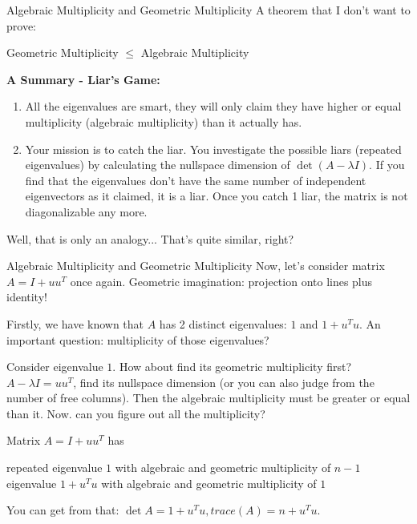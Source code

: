 \documentclass{beamer}
\begin{document}
\begin{frame}{Algebraic Multiplicity and Geometric Multiplicity}
A theorem that I don't want to prove:
\begin{center}
    Geometric Multiplicity $\leq $ Algebraic Multiplicity
\end{center}

\textbf{A Summary - Liar's Game:}
\begin{enumerate}
    \item All the eigenvalues are smart, they will only claim they have higher or equal multiplicity (algebraic multiplicity) than it actually has.
    \item Your mission is to catch the liar. You investigate the possible liars (repeated eigenvalues) by calculating the nullspace dimension of $\det (A-\lambda I)$. If you find that the eigenvalues don't have the same number of independent eigenvectors as it claimed, it is a liar. Once you catch 1 liar, the matrix is not diagonalizable any more.
\end{enumerate}

Well, that is only an analogy... That's quite similar, right?
\end{frame}

\begin{frame}{Algebraic Multiplicity and Geometric Multiplicity}
Now, let's consider matrix $A=I+uu^T$ once again. Geometric imagination: projection onto lines plus identity!

\vspace{3pt}
Firstly, we have known that $A$ has 2 distinct eigenvalues: $1$ and $1+u^Tu$. An important question: multiplicity of those eigenvalues?

\vspace{3pt}
Consider eigenvalue $1$. How about find its geometric multiplicity first? $A-\lambda I=uu^T$, find its nullspace dimension (or you can also judge from the number of free columns). Then the algebraic multiplicity must be greater or equal than it. Now. can you figure out all the multiplicity?

\vspace{3pt}
Matrix $A=I+uu^T$ has
\begin{center}
    repeated eigenvalue $1$ with algebraic and geometric multiplicity of $n-1$\\ eigenvalue $1+u^Tu$ with algebraic and geometric multiplicity of $1$
\end{center}

You can get from that: $\det A=1+u^Tu, trace(A)=n+u^Tu$.

\end{frame}
\end{document}
